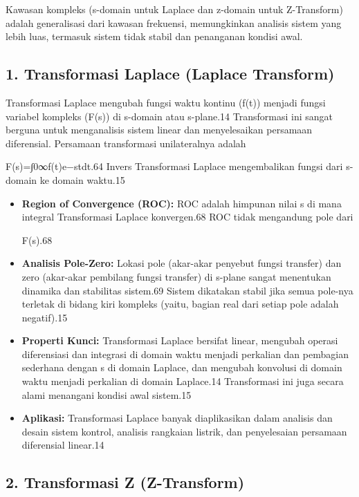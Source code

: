 \documentclass[
  letterpaper,
  DIV=11,
  numbers=noendperiod]{scrreprt}
\begin{document}
Kawasan kompleks (s-domain untuk Laplace dan z-domain untuk Z-Transform)
adalah generalisasi dari kawasan frekuensi, memungkinkan analisis sistem
yang lebih luas, termasuk sistem tidak stabil dan penanganan kondisi
awal.

\subsection{1. Transformasi Laplace (Laplace
Transform)}\label{transformasi-laplace-laplace-transform}

Transformasi Laplace mengubah fungsi waktu kontinu (f(t)) menjadi fungsi
variabel kompleks (F(s)) di s-domain atau s-plane.14 Transformasi ini
sangat berguna untuk menganalisis sistem linear dan menyelesaikan
persamaan diferensial. Persamaan transformasi unilateralnya adalah

F(s)=∫0∞\hspace{0pt}f(t)e−stdt.64 Invers Transformasi Laplace
mengembalikan fungsi dari s-domain ke domain waktu.15

\begin{itemize}
\item
  \textbf{Region of Convergence (ROC):} ROC adalah himpunan nilai s di
  mana integral Transformasi Laplace konvergen.68 ROC tidak mengandung
  pole dari

  F(s).68
\item
  \textbf{Analisis Pole-Zero:} Lokasi pole (akar-akar penyebut fungsi
  transfer) dan zero (akar-akar pembilang fungsi transfer) di s-plane
  sangat menentukan dinamika dan stabilitas sistem.69 Sistem dikatakan
  stabil jika semua pole-nya terletak di bidang kiri kompleks (yaitu,
  bagian real dari setiap pole adalah negatif).15
\item
  \textbf{Properti Kunci:} Transformasi Laplace bersifat linear,
  mengubah operasi diferensiasi dan integrasi di domain waktu menjadi
  perkalian dan pembagian sederhana dengan s di domain Laplace, dan
  mengubah konvolusi di domain waktu menjadi perkalian di domain
  Laplace.14 Transformasi ini juga secara alami menangani kondisi awal
  sistem.15
\item
  \textbf{Aplikasi:} Transformasi Laplace banyak diaplikasikan dalam
  analisis dan desain sistem kontrol, analisis rangkaian listrik, dan
  penyelesaian persamaan diferensial linear.14
\end{itemize}

\subsection{2. Transformasi Z
(Z-Transform)}\label{transformasi-z-z-transform}
\end{document}
